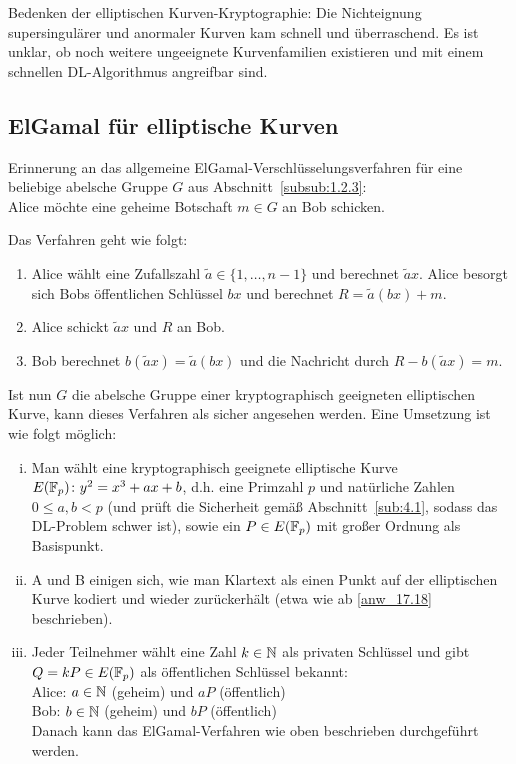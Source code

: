 \begin{bem}
	Bedenken der elliptischen Kurven-Kryptographie:
	Die Nichteignung supersingulärer und anormaler Kurven kam schnell und überraschend.
	Es ist unklar, ob noch weitere ungeeignete Kurvenfamilien existieren und mit einem schnellen DL-Algorithmus angreifbar sind.
\end{bem}

\nextlecture
\newpage
\subsection{ElGamal für elliptische Kurven}
\label{sub:4.2}
\begin{bem}
	Erinnerung an das allgemeine ElGamal-Verschlüsselungsverfahren für eine beliebige abelsche Gruppe $G$ aus Abschnitt~\ref{subsub:1.2.3}: \marginnote{[20]} \\
	Alice möchte eine geheime Botschaft $m \in G$ an Bob schicken. 
\end{bem}

\begin{anw}
	Das Verfahren geht wie folgt:
	\begin{enumerate}[(1)]
		\item Alice wählt eine Zufallszahl $\tilde{a} \in \{1,\dots,n-1\}$ und berechnet $\tilde{a}x$.
			Alice besorgt sich Bobs öffentlichen Schlüssel $bx$ und berechnet $R = \tilde{a}(bx)+m$.
		\item Alice schickt $\tilde{a} x$ und $R$ an Bob.
		\item Bob berechnet $b(\tilde{a}x) = \tilde{a}(bx)$ und die Nachricht durch $R-b(\tilde{a}x) = m$.
	\end{enumerate}
\end{anw}

\begin{anw}
	Ist nun $G$ die abelsche Gruppe einer kryptographisch geeigneten elliptischen Kurve, kann dieses Verfahren als sicher angesehen werden.
	Eine Umsetzung ist wie folgt möglich:
	\begin{enumerate}[(i)]
		\item Man wählt eine kryptographisch geeignete elliptische Kurve $E(\mathbb{F}_p)\colon y^2 = x^3 + ax + b$, d.h. eine Primzahl $p$ und natürliche Zahlen $0 \leq a,b < p$ (und prüft die Sicherheit gemäß Abschnitt~\ref{sub:4.1}, sodass das DL-Problem schwer ist), sowie ein $P \in E(\mathbb{F}_p)$ mit großer Ordnung als Basispunkt.
		\item A und B einigen sich, wie man Klartext als einen Punkt auf der elliptischen Kurve kodiert und wieder zurückerhält (etwa wie ab \ref{anw_17.18} beschrieben).
		\item Jeder Teilnehmer wählt eine Zahl $k \in \mathbb{N}$ als privaten Schlüssel und gibt $Q = kP \in E(\mathbb{F}_p)$ als öffentlichen Schlüssel bekannt: \\
		Alice: $a \in \mathbb{N}$ (geheim) und $aP$ (öffentlich) \\
		Bob: $b \in \mathbb{N}$ (geheim) und $bP$ (öffentlich) \\
		Danach kann das ElGamal-Verfahren wie oben beschrieben durchgeführt werden.
	\end{enumerate}
\end{anw}

